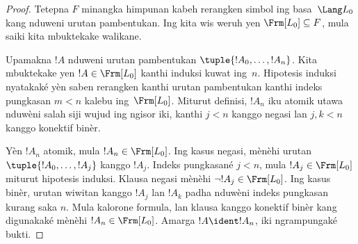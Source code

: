 \documentclass[../../../include/open-logic-section]{subfiles}
\begin{document}
\begin{proof}
Tetepna $F$ minangka himpunan kabeh rerangken simbol ing basa~$\Lang L_0$
kang nduweni urutan pambentukan. Ing  kita
wis weruh yen $\Frm[L_0] \subseteq F$, mula saiki kita mbuktekake
walikane.

Upamakna $!A$ nduweni urutan pambentukan $\tuple{!A_0,\dotsc,!A_n}$.
Kita mbuktekake yen $!A \in \Frm[L_0]$ kanthi induksi kuwat ing~$n$.
Hipotesis induksi nyatakaké yèn saben rerangken kanthi
urutan pambentukan kanthi indeks pungkasan $m<n$ kalebu ing~$\Frm[L_0]$.
Miturut definisi, $!A_n$ iku atomik utawa nduwèni salah siji wujud
ing ngisor iki, kanthi $j<n$ kanggo negasi lan $j,k<n$ kanggo
konektif binèr.
\begin{enumerate}
\end{enumerate}
Yèn $!A_n$ atomik, mula $!A_n\in\Frm[L_0]$. Ing kasus
negasi,  mènèhi urutan
$\tuple{!A_0,\dotsc,!A_j}$ kanggo $!A_j$. Indeks pungkasané $j<n$,
mula $!A_j\in\Frm[L_0]$ miturut hipotesis induksi. Klausa negasi
mènèhi $\lnot !A_j\in\Frm[L_0]$. Ing kasus binèr, urutan wiwitan
kanggo $!A_j$ lan $!A_k$ padha nduwèni indeks pungkasan kurang saka
$n$. Mula kalorone formula, lan klausa kanggo konektif binèr
kang digunakaké mènèhi $!A_n\in\Frm[L_0]$. Amarga $!A\ident !A_n$,
iki ngrampungaké bukti.
\end{proof}
\end{document}

